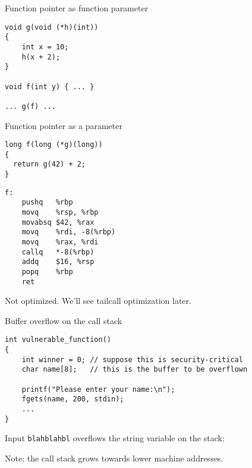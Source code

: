 \documentclass[landscape]{beamer}
\begin{document}
\begin{frame}[fragile]{Function pointer as function parameter}
\begin{verbatim}
void g(void (*h)(int))
{
    int x = 10;
    h(x + 2);
}
    
void f(int y) { ... }

... g(f) ...
\end{verbatim}

  
\end{frame}   


\begin{frame}[fragile]{Function pointer as a parameter}
\begin{minipage}{.5\textwidth}
\begin{verbatim}
long f(long (*g)(long))
{
  return g(42) + 2;
}
\end{verbatim}
\end{minipage}
%
\begin{minipage}{.4\textwidth}
\begin{verbatim}
f:                   
	pushq	%rbp
	movq	%rsp, %rbp
	movabsq	$42, %rax
	movq	%rdi, -8(%rbp)
	movq	%rax, %rdi
	callq	*-8(%rbp)
	addq	$16, %rsp
	popq	%rbp
	ret
\end{verbatim}
\end{minipage}
\vspace{3em}

Not optimized. We'll see tailcall optimization later.
\end{frame}


\begin{frame}[fragile]{Buffer overflow on the call stack}
\small
\begin{verbatim}
int vulnerable_function()
{
    int winner = 0; // suppose this is security-critical
    char name[8];   // this is the buffer to be overflown
    
    printf("Please enter your name:\n");
    fgets(name, 200, stdin);
    ...
}
\end{verbatim}
Input \texttt{blahblahbl} overflows the string variable on the stack:
\begin{center}
  \end{center}
 Note: the call stack grows towards \alert{lower} machine addresses.
\end{frame} 
\end{document}
